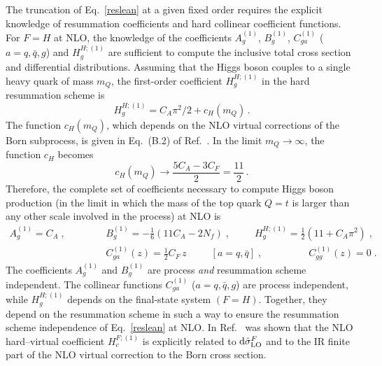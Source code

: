 \documentclass[12pt]{article}
\def\beeq{\begin{eqnarray}}
\def\eeeq{\end{eqnarray}}
\def\nn{\nonumber}
\newcommand\f[2]{\frac{#1}{#2}}
\def\to{\rightarrow}
\DeclareRobustCommand{\rd}{\ensuremath{\mathrm{d}}}
\begin{document}
The truncation of Eq.~\eqref{reslean} at a given fixed order requires the explicit knowledge of resummation coefficients and hard collinear coefficient functions.
For $F=H$ at NLO, the knowledge of the coefficients $A^{(1)}_{g}$, $B^{(1)}_{g}$, $C^{(1)}_{ga}$ ($a=q,{\bar q},g$) and $H^{H;(1)}_{g}$ are sufficient to compute the inclusive total cross section and differential distributions. Assuming that the Higgs boson couples to a single heavy quark of mass $m_Q$, the first-order coefficient $H_g^{H;(1)}$ in the hard resummation scheme is~\cite{Catani:2013tia}
\begin{equation}
\label{H1g}
H_g^{H;(1)}=C_A\pi^2/2+c_H(m_Q)\, .
\end{equation}
The function $c_H(m_Q)$, which depends on the NLO virtual corrections of the Born subprocess, is given in Eq.~(B.2) of Ref.~\cite{Spira:1995rr}. In the limit $m_Q\to \infty$, the function $c_H$ becomes
\begin{equation}
c_H(m_Q)\longrightarrow\f{5C_A-3C_F}{2}=\f{11}{2}\, .
\end{equation}
Therefore, the complete set of coefficients necessary to compute Higgs boson production (in the limit in which the mass of the top quark $Q=t$ is larger than any other scale involved in the process) at NLO is
\beeq
\label{eq:nloconstants}
A^{(1)}_{g}=C_{A}\;,\;\;\;\;\;\;\;\;\;&&B^{(1)}_{g}=- \f{1}{6} \left( 11 C_A - 2 N_f \right)\;,\;\;\;\;\;\;\;\;\;H^{H;(1)}_{g}=\f{1}{2}(11+C_{A}\pi^{2})\;,\nn\\
&&\!\!\!\!\!\!\!\!\!\!\!\!\!\!\!\!\!\!\!\!\!\!\!\!\!\!\!\!\!\!\!\!\!C^{(1)}_{ga}(z)=\f{1}{2}C_F\, z\;\;\;\;\;\;\;\;\;\left[a=q,{\bar q}\right]\;,\;\;\;\;\;\;\;\;\;\;\;\;\;\;\;\;\;C^{(1)}_{gg}(z)=0\;.
\eeeq
The coefficients $A^{(1)}_{g}$ and $B^{(1)}_{g}$ are process {\em and} resummation scheme independent. The collinear functions $C^{(1)}_{ga}$ ($a=q,{\bar q},g$) are process independent, while $H^{H;(1)}_{g}$ depends on the final-state system $(F=H)$. Together,  they depend on the resummation scheme in such a way to ensure the resummation scheme independence of Eq.~\eqref{reslean} at NLO. In Ref.~\cite{deFlorian:2001zd} was shown that the NLO hard--virtual coefficient $H^{F;(1)}_{c}$ is explicitly related to $\rd{\hat \sigma}^{F}_{\rm LO}$ and to the IR finite part of the NLO virtual correction to the Born cross section. 
\end{document}
